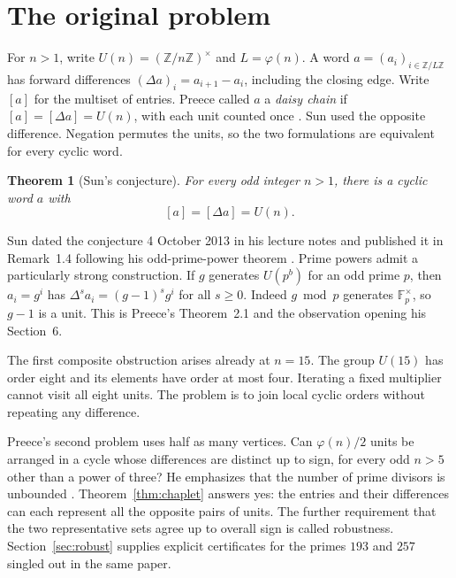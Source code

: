 \documentclass[11pt,a4paper]{article}
\newtheorem{theorem}{Theorem}[section]
\newcommand{\U}{U}
\newcommand{\F}{\mathbb F}
\newcommand{\Z}{\mathbb Z}
\begin{document}
\section{The original problem}
For $n>1$, write $\U(n)=(\Z/n\Z)^\times$ and $L=\varphi(n)$. A word $a=(a_i)_{i\in\Z/L\Z}$ has forward differences $(\Delta a)_i=a_{i+1}-a_i$, including the closing edge. Write $[a]$ for the multiset of entries. Preece called $a$ a \emph{daisy chain} if $[a]=[\Delta a]=\U(n)$, with each unit counted once \cite{preece08}. Sun used the opposite difference. Negation permutes the units, so the two formulations are equivalent for every cyclic word.
\begin{theorem}[Sun's conjecture]\label{thm:sun}
For every odd integer $n>1$, there is a cyclic word $a$ with
\[
                 [a]=[\Delta a]=\U(n).
\]
\end{theorem}
Sun dated the conjecture 4 October 2013 in his lecture notes \cite{sun-talk} and published it in Remark~1.4 following his odd-prime-power theorem \cite{sun}. Prime powers admit a particularly strong construction. If $g$ generates $\U(p^b)$ for an odd prime $p$, then $a_i=g^i$ has $\Delta^s a_i=(g-1)^s g^i$ for all $s\ge0$. Indeed $g\bmod p$ generates $\F_p^\times$, so $g-1$ is a unit. This is Preece's Theorem~2.1 and the observation opening his Section~6.
\par
The first composite obstruction arises already at $n=15$. The group $\U(15)$ has order eight and its elements have order at most four. Iterating a fixed multiplier cannot visit all eight units. The problem is to join local cyclic orders without repeating any difference.
\par
Preece's second problem uses half as many vertices. Can $\varphi(n)/2$ units be arranged in a cycle whose differences are distinct up to sign, for every odd $n>5$ other than a power of three? He emphasizes that the number of prime divisors is unbounded \cite[Section~10]{chaplet}. Theorem~\ref{thm:chaplet} answers yes: the entries and their differences can each represent all the opposite pairs of units. The further requirement that the two representative sets agree up to overall sign is called robustness. Section~\ref{sec:robust} supplies explicit certificates for the primes $193$ and $257$ singled out in the same paper.
\clearpage
\end{document}
